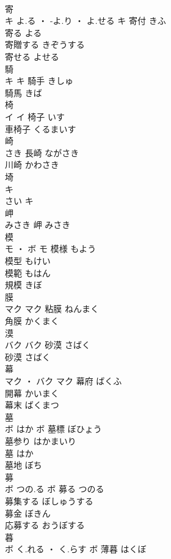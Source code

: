 \documentclass[8pt]{extreport}
\begin{document}
\begin{CJK}{UTF8}{min}
\\	寄	
\\	キ	よ.る ・ -よ.り ・ よ.せる	キ	寄付	きふ	
\\	寄る	よる	
\\	寄贈する	きぞうする	
\\	寄せる	よせる	
\\	騎	
\\	キ		キ	騎手	きしゅ	
\\	騎馬	きば	
\\	椅	
\\	イ		イ	椅子	いす	
\\	車椅子	くるまいす	
\\	崎	
\\	さき														長崎	ながさき	
\\	川崎	かわさき	
\\	埼	
\\	キ
\\	さい	キ
\\	岬	
\\	みさき														岬	みさき	
\\	模	
\\	モ ・ ボ		モ	模様	もよう	
\\	模型	もけい	
\\	模範	もはん	
\\	規模	きぼ	
\\	膜	
\\	マク		マク	粘膜	ねんまく	
\\	角膜	かくまく	
\\	漠	
\\	バク		バク	砂漠	さばく	
\\	砂漠	さばく	
\\	幕	
\\	マク ・ バク		マク	幕府	ばくふ	
\\	開幕	かいまく	
\\	幕末	ばくまつ	
\\	墓	
\\	ボ	はか	ボ	墓標	ぼひょう	
\\	墓参り	はかまいり	
\\	墓	はか	
\\	墓地	ぼち	
\\	募	
\\	ボ	つの.る	ボ	募る	つのる	
\\	募集する	ぼしゅうする	
\\	募金	ぼきん	
\\	応募する	おうぼする	
\\	暮	
\\	ボ	く.れる ・ く.らす	ボ	薄暮	はくぼ	

\end{CJK}
\end{document}

